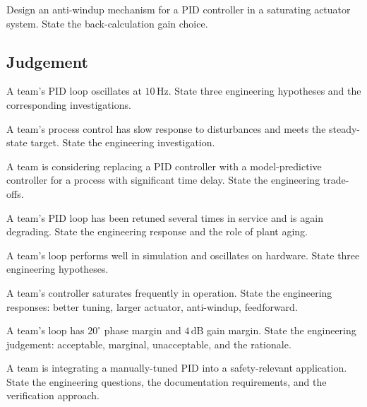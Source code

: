 \begin{exercise}
Design an anti-windup mechanism for a PID controller in a saturating actuator system. State the back-calculation gain choice.
\end{exercise}

\subsection*{Judgement}

\begin{exercise}
A team's PID loop oscillates at $10\,\text{Hz}$. State three engineering hypotheses and the corresponding investigations.
\end{exercise}

\begin{exercise}
A team's process control has slow response to disturbances and meets the steady-state target. State the engineering investigation.
\end{exercise}

\begin{exercise}
A team is considering replacing a PID controller with a model-predictive controller for a process with significant time delay. State the engineering trade-offs.
\end{exercise}

\begin{exercise}
A team's PID loop has been retuned several times in service and is again degrading. State the engineering response and the role of plant aging.
\end{exercise}

\begin{exercise}
A team's loop performs well in simulation and oscillates on hardware. State three engineering hypotheses.
\end{exercise}

\begin{exercise}
A team's controller saturates frequently in operation. State the engineering responses: better tuning, larger actuator, anti-windup, feedforward.
\end{exercise}

\begin{exercise}
A team's loop has $20^\circ$ phase margin and $4\,\text{dB}$ gain margin. State the engineering judgement: acceptable, marginal, unacceptable, and the rationale.
\end{exercise}

\begin{exercise}
A team is integrating a manually-tuned PID into a safety-relevant application. State the engineering questions, the documentation requirements, and the verification approach.
\end{exercise}

